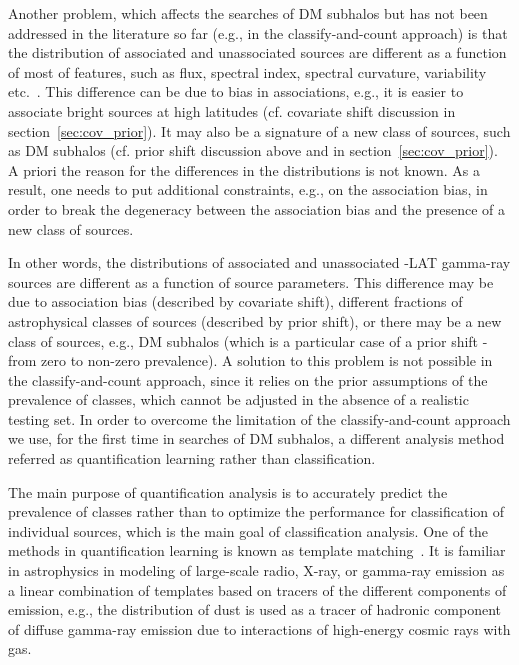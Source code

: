 Another problem, which affects the searches of DM subhalos but has not been addressed in the literature so far (e.g., in the classify-and-count approach) is that the distribution of associated and unassociated sources are different as a function of most of features, such as flux, spectral index, spectral curvature, variability etc.~\cite{2022ApJS..260...53A, 2023RASTI...2..735M}.
This difference can be due to bias in associations, e.g., it is easier to associate bright sources at high latitudes (cf. covariate shift discussion in section~\ref{sec:cov_prior}). It may also be a signature of a new class of sources, such as DM subhalos (cf. prior shift discussion above and in section~\ref{sec:cov_prior}).
A priori the reason for the differences in the distributions is not known. As a result, one needs to put additional constraints, e.g., on the association bias, in order to break the degeneracy between the association bias and the presence of a new class of sources.

In other words, the distributions of associated and unassociated \Fermi-LAT gamma-ray sources are different as a function of source parameters.
This difference may be due to association bias (described by covariate shift), different fractions of astrophysical classes of sources (described by prior shift), or there may be a new class of sources, e.g., DM subhalos (which is a particular case of a prior shift - from zero to non-zero prevalence).
A solution to this problem is not possible in the classify-and-count approach, since it relies on the prior assumptions of the prevalence of classes, which cannot be adjusted in the absence of a realistic testing set.
In order to overcome the limitation of the classify-and-count approach we use, for the first time in searches of DM subhalos, a different analysis method referred as quantification learning rather than classification.

The main purpose of quantification analysis 
\cite{10.1145/3117807_Gonzalez_quantification, 2022arXiv221108063M, esuli2023learning} 
is to accurately predict the prevalence of classes rather than to optimize the performance for classification of individual sources, which is the main goal of classification analysis.
One of the methods in quantification learning is known as template matching~\cite{2024arXiv240100490M}. It is familiar in astrophysics in modeling of large-scale radio, X-ray, or gamma-ray emission as a linear combination of templates based on tracers of the different components of emission, e.g., the distribution of dust is used as a tracer of hadronic component of diffuse gamma-ray emission due to interactions of high-energy cosmic rays with gas.

